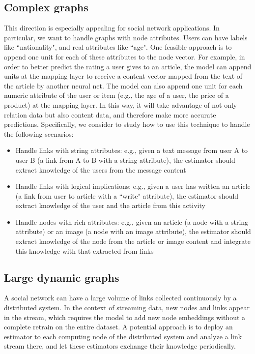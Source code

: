 \documentclass[12pt]{WSUThesis}
\theoremstyle{definition}
\begin{document}
\subsection{Complex graphs}
This direction is especially appealing for social network applications.
In particular, we want to handle graphs with node attributes.
Users can have labels like ``nationality", and real attributes like ``age".
One feasible approach is to append one unit for each of these attributes to the node vector.
For example, in order to better predict the rating a user gives to an article,
the model can append units at the mapping layer to receive a content vector 
mapped from the text of the article by another neural net.
The model can also append one unit for each numeric attribute of the user or 
item (e.g., the age of a user, the price of a product) at the mapping layer.
In this way, it will take advantage of not only relation data but also content 
data, and therefore make more accurate predictions.
Specifically, we consider to study how to use this technique to handle the 
following scenarios:
\begin{itemize}
	\item Handle links with string attributes: e.g., given a text message from 
	user A to user B (a link from A to B with a string attribute), the 
	estimator should extract knowledge of the users from the message content
	\item Handle links with logical implications: e.g., given a user has 
	written an article (a link from user to article with a ``write" attribute), 
	the estimator should extract knowledge of the user and the article from 
	this activity
	\item Handle nodes with rich attributes: e.g., given an article (a node 
	with a string attribute) or an image (a node with an image attribute), the 
	estimator should extract knowledge of the node from the article or image 
	content and integrate this knowledge with that extracted from links
\end{itemize}

\subsection{Large dynamic graphs}
A social network can have a large volume of links collected continuously by a
distributed system.
In the context of streaming data, new nodes and links appear in the stream, which requires the model to add new node embeddings without a complete retrain on the entire dataset.
A potential approach is to deploy an estimator to each computing node of
the distributed system and analyze a link stream there,
and let these estimators exchange their knowledge periodically.
\end{document}
